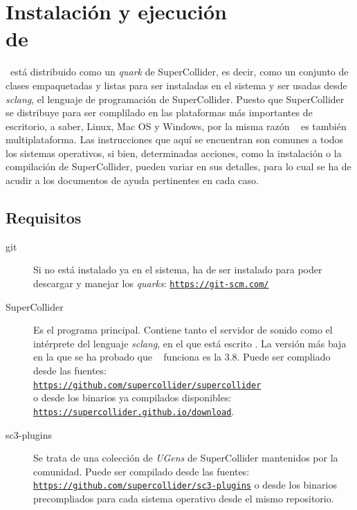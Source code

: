  \chapter[Instalación y ejecución de \appName]{Instalación y ejecución\\ de \appName}

\appName~está distribuido como un \textit{quark} de SuperCollider, es decir, como un conjunto de clases empaquetadas y listas para ser instaladas en el sistema y ser usadas desde \textit{sclang}, el lenguaje de programación de SuperCollider.  Puesto que SuperCollider se distribuye para ser complilado en las plataformas más importantes de escritorio, a saber, Linux, Mac OS y Windows, por la misma razón \appName~ es también multiplataforma. Las instrucciones que aquí se encuentran son comunes a todos los sistemas operativos, si bien, determinadas acciones, como la instalación o la compilación de SuperCollider, pueden variar en sus detalles, para lo cual se ha de acudir a los documentos de ayuda pertinentes en cada caso.

\section{Requisitos}
\begin{description}
	\item[git] Si no está instalado ya en el sistema, ha de ser instalado para poder descargar y manejar los \textit{quarks}: \href{https://git-scm.com/}{\texttt{https://git-scm.com/}}
	
	\item[SuperCollider] Es el programa principal. Contiene tanto el servidor de sonido como el intérprete del lenguaje \textit{sclang}, en el que está escrito \appName. La versión más baja en la que se ha probado que \appName~ funciona es la 3.8. Puede ser compliado desde las fuentes:\\ \href{https://github.com/supercollider/supercollider}{\texttt{https://github.com/supercollider/supercollider}}\\ o desde los binarios ya compilados disponibles:\\ \href{https://supercollider.github.io/download}{\texttt{https://supercollider.github.io/download}}.
	
	\item[sc3-plugins]  Se trata de una colección de \textit{UGens} de SuperCollider mantenidos por la comunidad. Puede ser compilado desde las fuentes:\\ \href{https://github.com/supercollider/sc3-plugins}{\texttt{https://github.com/supercollider/sc3-plugins}} o desde los binarios precompliados para cada sistema operativo desde el mismo repositorio.
\end{description}


